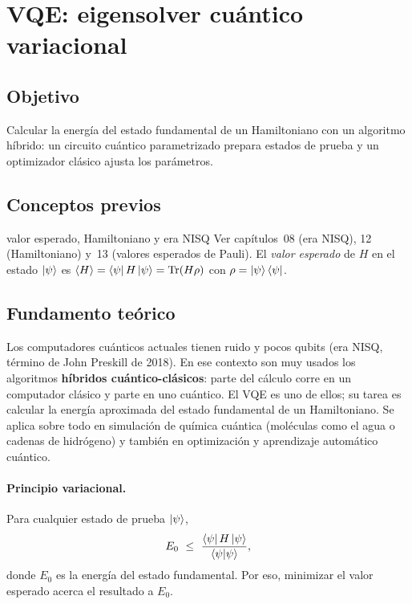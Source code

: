 \def\tituloconcepto{VQE}


\section{VQE: eigensolver cuántico variacional}

\subsection{Objetivo}
Calcular la energía del estado fundamental de un Hamiltoniano con un algoritmo
híbrido: un circuito cuántico parametrizado prepara estados de prueba y un
optimizador clásico ajusta los parámetros.

\subsection{Conceptos previos}
\begin{concepto}{valor esperado, Hamiltoniano y era NISQ}
Ver capítulos~08 (era NISQ), 12 (Hamiltoniano) y~13 (valores esperados de Pauli).
El \emph{valor esperado} de $H$ en el estado $\left|\psi\right\rangle$ es
$\langle H\rangle=\left\langle\psi\right| H\left|\psi\right\rangle=\operatorname{Tr}(H\rho)$ con $\rho=\left|\psi\right\rangle\left\langle\psi\right|$.
\end{concepto}

\subsection{Fundamento teórico}
Los computadores cuánticos actuales tienen ruido y pocos qubits (era NISQ, término
de John Preskill de 2018). En ese contexto son muy usados los algoritmos
\textbf{híbridos cuántico-clásicos}: parte del cálculo corre en un computador
clásico y parte en uno cuántico. El VQE es uno de ellos; su tarea es calcular
la energía aproximada del estado fundamental de un Hamiltoniano. Se aplica
sobre todo en simulación de química cuántica (moléculas como el agua o cadenas de
hidrógeno) y también en optimización y aprendizaje automático cuántico.

\paragraph{Principio variacional.} Para cualquier estado de prueba $\left|\psi\right\rangle$,
\begin{equation}
  E_0\ \le\ \frac{\bra\psi H\ket\psi}{\langle\psi|\psi\rangle} ,
\end{equation}
donde $E_0$ es la energía del estado fundamental. Por eso, minimizar el valor
esperado acerca el resultado a $E_0$.

